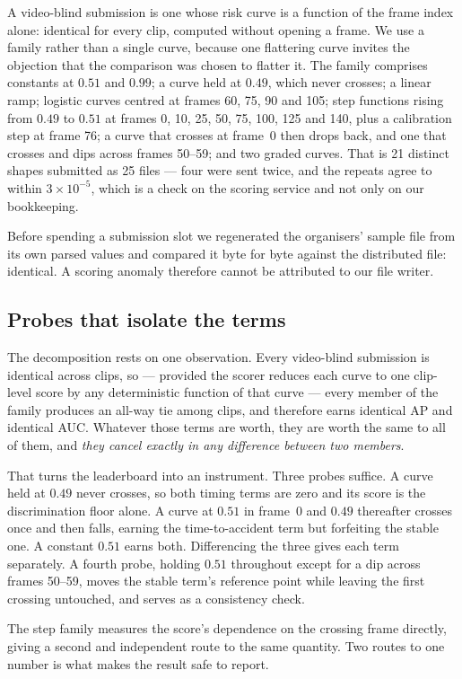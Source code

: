 A video-blind submission is one whose risk curve is a function of the frame
index alone: identical for every clip, computed without opening a frame. We use
a family rather than a single curve, because one flattering curve invites the
objection that the comparison was chosen to flatter it. The family comprises
constants at $0.51$ and $0.99$; a curve held at $0.49$, which never crosses; a
linear ramp; logistic curves centred at frames 60, 75, 90 and 105; step
functions rising from $0.49$ to $0.51$ at frames 0, 10, 25, 50, 75, 100, 125
and 140, plus a calibration step at frame 76; a curve that crosses at frame~0
then drops back, and one that crosses and dips across frames 50--59; and two
graded curves. That is 21 distinct shapes submitted as 25 files --- four were
sent twice, and the repeats agree to within $3\times10^{-5}$, which is a check
on the scoring service and not only on our bookkeeping.

Before spending a submission slot we regenerated the organisers' sample file
from its own parsed values and compared it byte for byte against the
distributed file: identical. A scoring anomaly therefore cannot be attributed
to our file writer.

\subsection{Probes that isolate the terms}
\label{sec:probes}

The decomposition rests on one observation. Every video-blind submission is
identical across clips, so --- provided the scorer reduces each curve to one
clip-level score by any deterministic function of that curve --- every member
of the family produces an all-way tie among clips, and therefore earns
identical AP and identical AUC. Whatever those terms are worth, they are worth
the same to all of them, and \emph{they cancel exactly in any difference
between two members}.

That turns the leaderboard into an instrument. Three probes suffice. A curve
held at $0.49$ never crosses, so both timing terms are zero and its score is
the discrimination floor alone. A curve at $0.51$ in frame~0 and $0.49$
thereafter crosses once and then falls, earning the time-to-accident term but
forfeiting the stable one. A constant $0.51$ earns both. Differencing the three
gives each term separately. A fourth probe, holding $0.51$ throughout except
for a dip across frames 50--59, moves the stable term's reference point while
leaving the first crossing untouched, and serves as a consistency check.

The step family measures the score's dependence on the crossing frame directly,
giving a second and independent route to the same quantity. Two routes to one
number is what makes the result safe to report.
